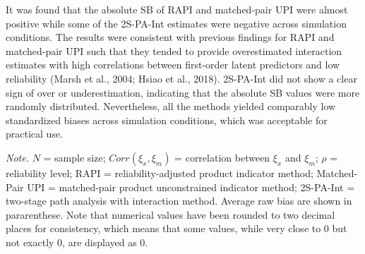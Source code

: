 \documentclass[
  man]{apa6}
\newenvironment{lltable}{\begin{landscape}\centering\begin{ThreePartTable}}{\end{ThreePartTable}\end{landscape}}
\begin{document}
It was found that the absolute SB of RAPI and matched-pair UPI were almost positive while some of the 2S-PA-Int estimates were negative across simulation conditions. The results were consistent with previous findings for RAPI and matched-pair UPI such that they tended to provide overestimated interaction estimates with high correlations between first-order latent predictors and low reliability (Marsh et al., 2004; Hsiao et al., 2018). 2S-PA-Int did not show a clear sign of over or underestimation, indicating that the absolute SB values were more randomly distributed. Nevertheless, all the methods yielded comparably low standardized biases across simulation conditions, which was acceptable for practical use.

\begin{lltable}

\begin{TableNotes}[para]
\normalsize{\textit{Note.} $\textit{N}$ = sample size; $Corr(\xi_{x}, \xi_{m})$ = correlation between $\xi_{x}$ and $\xi_{m}$; $\rho$ = reliability level; RAPI = reliability-adjusted product indicator method; Matched-Pair UPI = matched-pair product unconstrained indicator method; 2S-PA-Int = two-stage path analysis with interaction method. Average raw bias are shown in pararenthese. Note that numerical values have been rounded to two decimal places for consistency, which means that some values, while very close to 0 but not exactly 0, are displayed as 0.}
\end{TableNotes}

\small{

}
\end{lltable}
\end{document}

